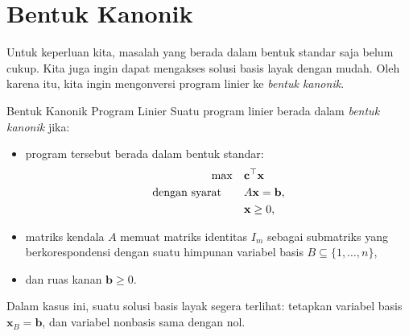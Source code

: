 \section{Bentuk Kanonik}
Untuk keperluan kita, masalah yang berada dalam bentuk standar saja belum cukup. Kita juga ingin dapat mengakses solusi basis layak dengan mudah. Oleh karena itu, kita ingin mengonversi program linier ke \emph{bentuk kanonik}.

\begin{definition}{Bentuk Kanonik Program Linier}\label{def:canonical-form}
Suatu program linier berada dalam \emph{bentuk kanonik} jika:
\begin{itemize}
    \item program tersebut berada dalam bentuk standar:
    \[
    \begin{aligned}
    \max \quad & \mathbf{c}^\top \mathbf{x} \\
    \mbox{dengan syarat}\quad \quad & A \mathbf{x} = \mathbf{b}, \\
    & \mathbf{x} \geq 0,
    \end{aligned}
    \]
    \item matriks kendala \( A \) memuat matriks identitas \( I_m \) sebagai submatriks yang berkorespondensi dengan suatu himpunan variabel basis \( B \subseteq \{1, \dots, n\} \),
    \item dan ruas kanan \( \mathbf{b} \geq 0 \).
\end{itemize}
Dalam kasus ini, suatu solusi basis layak segera terlihat: tetapkan variabel basis \( \mathbf{x}_B = \mathbf{b} \), dan variabel nonbasis sama dengan nol.
\end{definition}

